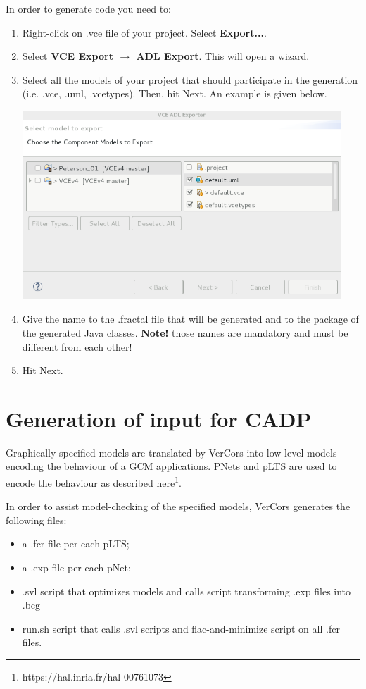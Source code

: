 \documentclass[12pt]{article}
\begin{document}
In order to generate code you need to:
\begin{enumerate}
\item
Right-click on .vce file of your project. Select \textbf{Export...}. 
\item
Select \textbf{VCE Export $\rightarrow$ ADL Export}. This will open a wizard.
\item
Select all the models of your project that should participate in the generation (i.e. .vce, .uml, .vcetypes). Then, hit Next. An example is given below.

     \centerline{
     \includegraphics[width=12cm]{draws/code-gen.png}
     \label{fig:vce-proj}
     }
     
\item
Give the name to the .fractal file that will be generated and to the package of the generated Java classes. \textbf{Note! } those names are mandatory and must be different from each other!
\item
Hit Next. 

\end{enumerate}

\section{Generation of input for CADP}

Graphically specified models are translated by VerCors into low-level models encoding the behaviour of a GCM applications. PNets and pLTS are used to encode the behaviour as described here\footnote{https://hal.inria.fr/hal-00761073}.

In order to assist model-checking of the specified models, VerCors generates the following files:
\begin{itemize}
\item
a .fcr file per each pLTS;
\item
a .exp file per each pNet;
\item
.svl script that optimizes models and calls script transforming .exp files into .bcg
\item
run.sh script that calls .svl scripts and flac-and-minimize script on all .fcr files.
\end{itemize}
\end{document}
